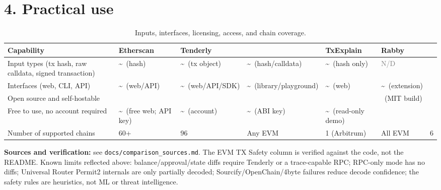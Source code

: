 \documentclass[10pt,a4paper]{article}
\newcommand{\Yes}{\textcolor{green!45!black}{\ding{51}}}
\newcommand{\No}{\textcolor{red!70!black}{\ding{55}}}
\newcommand{\Partial}{\textcolor{part}{\textbf{\textasciitilde}}}
\newcommand{\ND}{\textcolor{gray}{\textsf{N/D}}}
\begin{document}
\section*{4. Practical use}

\begin{table}[htbp]
\centering
\caption{Inputs, interfaces, licensing, access, and chain coverage.}
\label{tab:practical}
\footnotesize
\renewcommand{\arraystretch}{1.45}
\begin{tabularx}{\textwidth}{>{\raggedright\arraybackslash}p{4.3cm} *{5}{Y} G}
\toprule
\textbf{Capability} &
\textbf{Etherscan} &
\textbf{Tenderly} &
\textbf{} &
\textbf{TxExplain} &
\textbf{Rabby} &
\textbf{} \\
\midrule
Input types (tx hash, raw calldata, signed transaction)
    & \Partial\ (hash) & \Partial\ (tx object) & \Partial\ (hash/calldata) & \Partial\ (hash only) & \ND & \Yes \\
Interfaces (web, CLI, API)
    & \Partial\ (web/API) & \Partial\ (web/API/SDK) & \Partial\ (library/playground) & \Partial\ (web) & \Partial\ (extension) & \Yes \\
Open source and self-hostable
    & \No & \No & \Yes & \Yes & \Yes\ (MIT build) & \Yes \\
Free to use, no account required
    & \Partial\ (free web; API key) & \Partial\ (account) & \Partial\ (ABI key) & \Partial\ (read-only demo) & \Yes & \Yes \\
Number of supported chains
    & 60+ & 96 & Any EVM & 1 (Arbitrum) & All EVM & 6 \\
\bottomrule
\end{tabularx}
\end{table}


\vfill
\noindent\footnotesize
\textbf{Sources and verification:} see \texttt{docs/comparison\_sources.md}. The EVM TX
Safety column is verified against the code, not the README. Known limits reflected above:
balance/approval/state diffs require Tenderly or a trace-capable RPC; RPC-only mode has no
diffs; Universal Router Permit2 internals are only partially decoded; Sourcify/OpenChain/4byte
failures reduce decode confidence; the safety rules are heuristics, not ML or threat intelligence.
\end{document}

